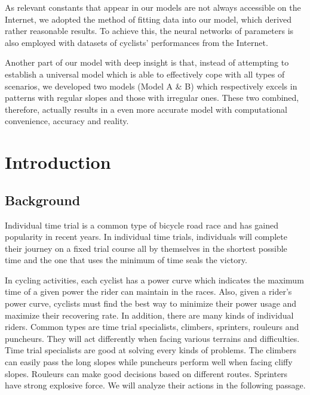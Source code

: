 \documentclass{article}
\begin{document}
	As relevant constants that appear in our models are not always accessible on the Internet, we adopted the method of fitting data into our model, which derived rather reasonable results. To achieve this, the neural networks of parameters is also employed with datasets of cyclists' performances from the Internet.

	Another part of our model with deep insight is that, instead of attempting to establish a universal model which is able to effectively cope with all types of scenarios, we developed two models (Model A \& B) which respectively excels in patterns with regular slopes and those with irregular ones. These two combined, therefore, actually results in a even more accurate model with computational convenience, accuracy and reality.




    \clearpage
    \newpage
    \pagestyle{empty}
    \setlength{\headheight}{12pt}
    \renewcommand{\headrulewidth}{0.5pt}
    \renewcommand{\footrulewidth}{0.0pt}
    \pagestyle{fancy}
    \cfoot{}
    \lfoot{}
    \rfoot{}

    \clearpage
    \thispagestyle{empty}
    \tableofcontents
    \newpage
    \pagestyle{fancy}
    \setcounter{page}{1}

	\newpage
	\section{Introduction}
		\subsection{Background}
		Individual time trial is a common type of bicycle road race and has gained popularity in recent years. In individual time trials, individuals will complete their journey on a fixed trial course all by themselves in the shortest possible time and the one that uses the minimum of time seals the victory.

		In cycling activities, each cyclist has a power curve which indicates the maximum time of a given power the rider can maintain in the races. Also, given a rider's power curve, cyclists must find the best way to minimize their power usage and maximize their recovering rate. In addition, there are many kinds of individual riders. Common types are time trial specialists, climbers, sprinters, rouleurs and puncheurs. They will act differently when facing various terrains and difficulties. Time trial specialists are good at solving every kinds of problems. The climbers can easily pass the long slopes while puncheurs perform well when facing cliffy slopes. Rouleurs can make good decisions based on different routes. Sprinters have strong explosive force. We will analyze their actions in the following passage.
\end{document}
